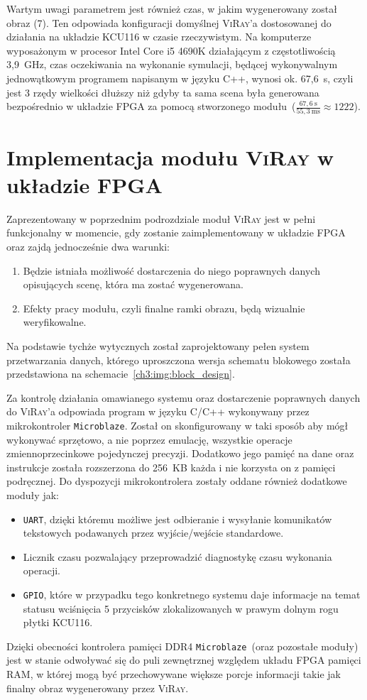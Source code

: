 Wartym uwagi parametrem jest również czas, w jakim wygenerowany został obraz (7). Ten odpowiada konfiguracji domyślnej \textsc{ViRay}'a dostosowanej do działania na układzie KCU116 w czasie rzeczywistym. Na komputerze wyposażonym w procesor Intel Core i5 4690K działającym z częstotliwością 3,9~GHz, czas oczekiwania na wykonanie symulacji, będącej wykonywalnym jednowątkowym programem napisanym w języku C++, wynosi ok. 67,6~s, czyli jest 3 rzędy wielkości dłuższy niż gdyby ta sama scena była generowana bezpośrednio w układzie FPGA za pomocą stworzonego modułu~($\frac{67,6~\mathrm{s}}{55,3~\mathrm{ms}}\approx 1222$). 







\section{Implementacja modułu \textsc{ViRay} w układzie FPGA}
Zaprezentowany w poprzednim podrozdziale moduł \textsc{ViRay} jest w pełni funkcjonalny w momencie, gdy zostanie zaimplementowany w układzie FPGA oraz zajdą jednocześnie dwa warunki:
\begin{enumerate}
\item Będzie istniała możliwość dostarczenia do niego poprawnych danych opisujących scenę, która ma zostać wygenerowana.
\item Efekty pracy modułu, czyli finalne ramki obrazu, będą wizualnie weryfikowalne.
\end{enumerate}
Na podstawie tychże wytycznych został zaprojektowany pełen system przetwarzania danych, którego uproszczona wersja schematu blokowego została przedstawiona na schemacie~\ref{ch3:img:block_design}.

Za kontrolę działania omawianego systemu oraz dostarczenie poprawnych danych do \textsc{ViRay}'a odpowiada program w języku C/C++ wykonywany przez mikrokontroler \texttt{Microblaze}. Został on skonfigurowany w taki sposób aby mógł wykonywać sprzętowo, a nie poprzez emulację, wszystkie operacje zmiennoprzecinkowe pojedynczej precyzji. Dodatkowo jego pamięć na dane oraz instrukcje została rozszerzona do 256~KB każda i nie korzysta on z pamięci podręcznej. Do dyspozycji mikrokontrolera zostały oddane również dodatkowe moduły jak:
\begin{itemize}
\item \texttt{UART}, dzięki któremu możliwe jest odbieranie i wysyłanie komunikatów tekstowych podawanych przez wyjście/wejście standardowe.
\item Licznik czasu pozwalający przeprowadzić diagnostykę czasu wykonania operacji.
\item \texttt{GPIO}, które w przypadku tego konkretnego systemu daje informacje na temat statusu wciśnięcia 5 przycisków zlokalizowanych w prawym dolnym rogu płytki KCU116.
\end{itemize}
Dzięki obecności kontrolera pamięci DDR4 \texttt{Microblaze}~(oraz pozostałe moduły) jest w stanie odwoływać się do puli zewnętrznej względem układu FPGA pamięci RAM, w której mogą być przechowywane większe porcje informacji takie jak finalny obraz wygenerowany przez \textsc{ViRay}.

